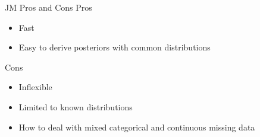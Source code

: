 \begin{frame}{JM Pros and Cons}
Pros
 \begin{itemize}
  \item Fast
  \item Easy to derive posteriors with common distributions
 \end{itemize}

 Cons
 \begin{itemize}
  \item Inflexible
  \item Limited to known distributions
  \item How to deal with mixed categorical and continuous missing data
 \end{itemize}

\end{frame}
